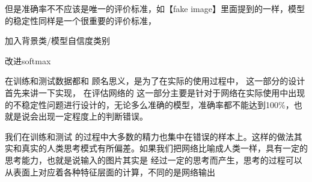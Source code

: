 但是准确率不不应该是唯一的评价标准，如【fake image】里面提到的一样，模型的稳定性同样是一个很重要的评价标准，

加入背景类/模型自信度类别

改进softmax



在训练和测试数据都和
顾名思义，是为了在实际的使用过程中，
这一部分的设计首先来讲一下实现，
在评估网络的
这一部分主要是针对于网络在实际使用中出现的不稳定性问题进行设计的，无论多么准确的模型，准确率都不能达到100\%，也就是说会出现一定程度上的判断错误。


我们在训练和测试
的过程中大多数的精力也集中在错误的样本上。这样的做法其实和真实的人类思考模式有所偏差。如果我们把网络比喻成人类一样，具有一定的思考能力，也就是说输入的图片其实是
经过一定的思考而产生，思考的过程可以从表面上对应着各种特征层面的计算，不同的是网络输出

